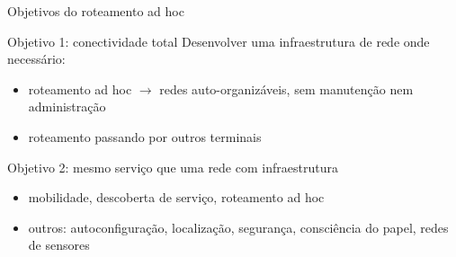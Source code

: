 \documentclass[aspectratio=169,11pt]{beamer}
\begin{document}
\begin{frame}{Objetivos do roteamento ad hoc}
  \begin{block}{Objetivo 1: conectividade total}
    Desenvolver uma infraestrutura de rede onde necessário:
    \begin{itemize}
      \item roteamento ad hoc $\rightarrow$ redes auto-organizáveis, sem manutenção nem administração
      \item roteamento passando por outros terminais
    \end{itemize}
  \end{block}
  \begin{block}{Objetivo 2: mesmo serviço que uma rede com infraestrutura}
    \begin{itemize}
      \item mobilidade, descoberta de serviço, roteamento ad hoc
      \item outros: autoconfiguração, localização, segurança, consciência do papel, redes de sensores
    \end{itemize}
  \end{block}
\end{frame}
\end{document}
